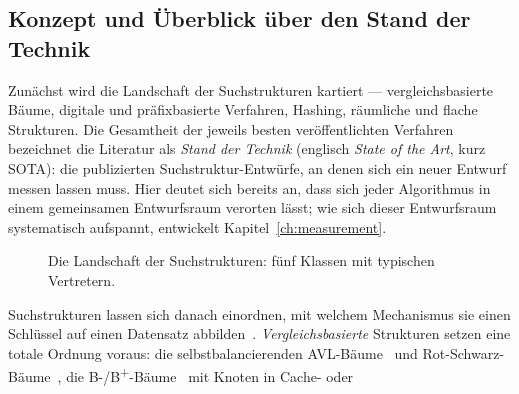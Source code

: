 \begin{nurkurz}
\section{Konzept und Überblick über den Stand der Technik}\label{sec:overview}
Zunächst wird die Landschaft der Suchstrukturen kartiert --- vergleichsbasierte Bäume, digitale und
präfixbasierte Verfahren, Hashing, räumliche und flache Strukturen. Die Gesamtheit der jeweils besten
veröffentlichten Verfahren bezeichnet die Literatur als \emph{Stand der Technik} (englisch \emph{State of the Art},
kurz SOTA): die publizierten Suchstruktur-Entwürfe, an denen sich ein neuer Entwurf messen lassen muss. Hier deutet
sich bereits an, dass sich jeder Algorithmus in einem gemeinsamen Entwurfsraum verorten lässt; wie sich dieser
Entwurfsraum systematisch aufspannt, entwickelt Kapitel~\ref{ch:measurement}.
\begin{figure}[htbp]\centering
{}
\caption{Die Landschaft der Suchstrukturen: fünf Klassen mit typischen Vertretern.}\label{fig:search-map}
\end{figure}
Suchstrukturen lassen sich danach einordnen, mit welchem Mechanismus sie einen Schlüssel auf einen Datensatz
abbilden~\cite{knuth1998taocp3}\@. \emph{Vergleichsbasierte} Strukturen setzen eine totale Ordnung voraus: die
selbstbalancierenden AVL-Bäume~\cite{adelsonvelsky1962avl} und Rot-Schwarz-Bäume~\cite{bayer1972symmetric,guibas1978redblack},
die B-/B\textsuperscript{+}-Bäume~\cite{bayer1972btree,comer1979btree} mit Knoten in Cache- oder

\end{nurkurz}
